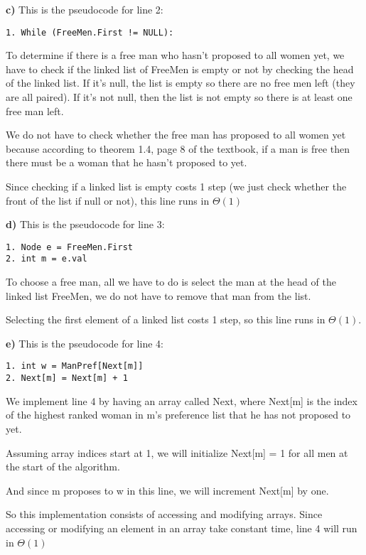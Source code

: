 \documentclass{article}
\begin{document}
\textbf{c)} This is the pseudocode for line 2:
\begin{lstlisting}
1. While (FreeMen.First != NULL):
\end{lstlisting}

To determine if there is a free man who hasn’t proposed to all women yet, we have to check if the linked list of FreeMen is empty or not by checking the head of the linked list. If it’s null, the list is empty so there are no free men left (they are all paired).  If it’s not null, then the list is not empty so there is at least one free man left.

We do not have to check whether the free man has proposed to all women yet because according to theorem 1.4, page 8 of the textbook, if a man is free then there must be a woman that he hasn’t proposed to yet.

Since checking if a linked list is empty costs 1 step (we just check whether the front of the list if null or not), this line runs in $\Theta(1)$

\textbf{d)} This is the pseudocode for line 3:
\begin{lstlisting}
1. Node e = FreeMen.First
2. int m = e.val

\end{lstlisting}

To choose a free man, all we have to do is select the man at the head of the linked list FreeMen, we do not have to remove that man from the list. 

Selecting the first element of a linked list costs 1 step, so this line runs in $\Theta(1)$.


\textbf{e)} This is the pseudocode for line 4:
\begin{lstlisting}
1. int w = ManPref[Next[m]]
2. Next[m] = Next[m] + 1
\end{lstlisting} 

We implement line 4 by having an array called Next, where Next[m] is the index of the highest ranked woman in m's preference list that he has not proposed to yet. 

Assuming array indices start at 1, we will initialize Next[m] = 1 for all men at the start of the algorithm. 

And since m proposes to w in this line, we will increment Next[m] by one.

So this implementation consists of accessing and modifying arrays. Since accessing or modifying an element in an array take constant time, line 4 will run in $\Theta(1)$
\end{document}

